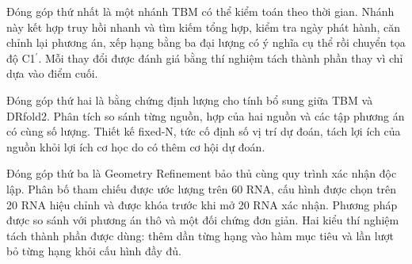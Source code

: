 \documentclass[12pt,a4paper,oneside]{report}
\newcommand{\cprime}{C1$^{\prime}$}
\begin{document}
\begin{table}[H]
\centering
\caption{Nguồn gốc các thành phần và thay đổi của luận văn.}
\label{tab:provenance_vi}
\end{table}

Đóng góp thứ nhất là một nhánh TBM có thể kiểm toán theo thời gian. Nhánh này kết hợp
truy hồi nhanh và tìm kiếm tổng hợp, kiểm tra ngày phát hành, căn chỉnh lại phương án,
xếp hạng bằng ba đại lượng có ý nghĩa cụ thể rồi chuyển tọa độ \cprime{}. Mỗi thay đổi
được đánh giá bằng thí nghiệm tách thành phần thay vì chỉ dựa vào điểm cuối.

Đóng góp thứ hai là bằng chứng định lượng cho tính bổ sung giữa TBM và DRfold2. Phân tích
so sánh từng nguồn, hợp của hai nguồn và các tập phương án có cùng số lượng. Thiết kế
fixed-N, tức cố định số vị trí dự đoán, tách lợi ích của nguồn khỏi lợi ích cơ học do có
thêm cơ hội dự đoán.

Đóng góp thứ ba là Geometry Refinement bảo thủ cùng quy trình xác nhận độc lập. Phân bố
tham chiếu được ước lượng trên 60 RNA, cấu hình được chọn trên 20 RNA hiệu chỉnh và được khóa trước
khi mở 20 RNA xác nhận. Phương pháp được so sánh với phương án thô và một đối chứng đơn
giản. Hai kiểu thí nghiệm tách thành phần được dùng: thêm dần từng hạng vào hàm mục tiêu
và lần lượt bỏ từng hạng khỏi cấu hình đầy đủ.
\end{document}

